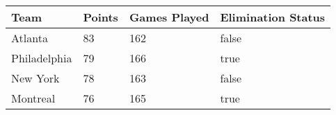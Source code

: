 \documentclass{report}
\begin{document}
\begin{tabular}{| l | l | l | l |}
\hline
Team & Points & Games Played & Elimination Status \\ \hline
Atlanta & 83 & 162 & false\\
Philadelphia & 79 & 166 & true\\
New York & 78 & 163 & false\\
Montreal & 76 & 165 & true\\\hline
\end{tabular}
\end{document}
